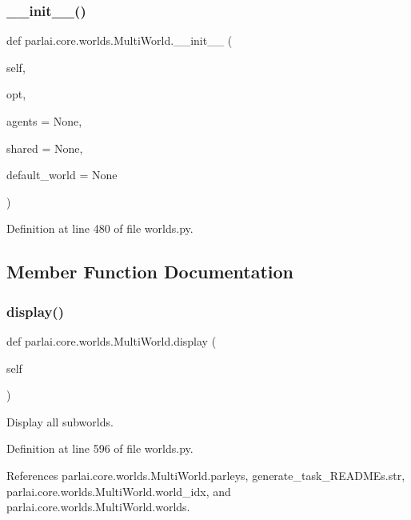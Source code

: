 \subsubsection{\texorpdfstring{\+\_\+\+\_\+init\+\_\+\+\_\+()}{\_\_init\_\_()}}
{\footnotesize\ttfamily def parlai.\+core.\+worlds.\+Multi\+World.\+\_\+\+\_\+init\+\_\+\+\_\+ (\begin{DoxyParamCaption}\item[{}]{self,  }\item[{}]{opt,  }\item[{}]{agents = {\ttfamily None},  }\item[{}]{shared = {\ttfamily None},  }\item[{}]{default\+\_\+world = {\ttfamily None} }\end{DoxyParamCaption})}



Definition at line 480 of file worlds.\+py.



\subsection{Member Function Documentation}
\mbox{\label{classparlai_1_1core_1_1worlds_1_1MultiWorld_a03a162a9c53ed806221e46762d3fcb52}} 
\subsubsection{\texorpdfstring{display()}{display()}}
{\footnotesize\ttfamily def parlai.\+core.\+worlds.\+Multi\+World.\+display (\begin{DoxyParamCaption}\item[{}]{self }\end{DoxyParamCaption})}

\begin{DoxyVerb}Display all subworlds.\end{DoxyVerb}
 

Definition at line 596 of file worlds.\+py.



References parlai.\+core.\+worlds.\+Multi\+World.\+parleys, generate\+\_\+task\+\_\+\+R\+E\+A\+D\+M\+Es.\+str, parlai.\+core.\+worlds.\+Multi\+World.\+world\+\_\+idx, and parlai.\+core.\+worlds.\+Multi\+World.\+worlds.

